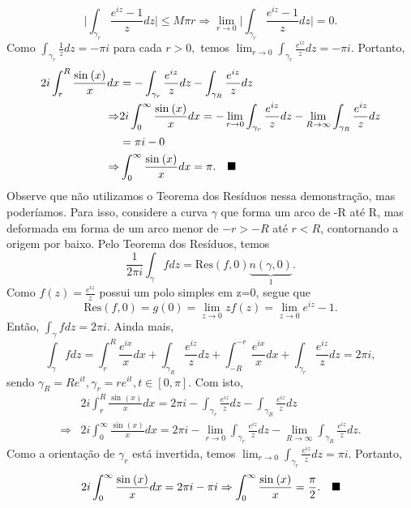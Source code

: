 \documentclass[ComplexAnalysis/complex.tex]{subfiles}
\begin{document}
\begin{exer*}
	\[
		\biggl\vert \int_{\gamma_{r}}^{}\frac{e^{iz}-1}{z}dz \biggr\vert \leq M\pi r \Rightarrow \lim_{r\to 0}\biggl\vert \int_{\gamma_{r}}^{}\frac{e^{iz}-1}{z}dz \biggr\vert = 0.
	\]
	Como \(\int_{\gamma_{r}}^{}\frac{1}{z}dz = -\pi i  \) para cada \(r > 0,\) temos \(\lim_{r\to 0}\int_{\gamma_{r}}^{}\frac{e^{iz}}{z}dz = -\pi i.\)
	Portanto,
	\begin{align*}
		2i \int_{r}^{R}\frac{\sin^{}{(x)}}{x}dx & = -\int_{\gamma_{r}}^{}\frac{e^{iz}}{z}dz - \int_{\gamma_{R}}^{}\frac{e^{iz}}{z}dz                                                                          \\
		\Rightarrow                             & 2i \int_{0}^{\infty}\frac{\sin^{}{(x)}}{x}dx= -\lim_{r\to 0}\int_{\gamma_{r}}^{}\frac{e^{iz}}{z}dz - \lim_{R\to \infty}\int_{\gamma_R}^{}\frac{e^{iz}}{z}dz \\
		                                        & =\pi i - 0                                                                                                                                                  \\
		\Rightarrow                             & \int_{0}^{\infty}\frac{\sin^{}{(x)}}{x}dx = \pi .\quad \text{$\blacksquare$}
	\end{align*}
	Observe que não utilizamos o Teorema dos Resíduos nessa demonstração, mas poderíamos. Para isso, considere a curva \(\gamma \)
	que forma um arco de -R até R, mas deformada em forma de um arco menor de \(-r > -R\) até \(r < R\), contornando a origem por baixo. Pelo Teorema
	dos Resíduos, temos
	\[
		\frac{1}{2\pi i}\int_{\gamma }^{}f dz = \mathrm{Res}(f, 0)\underbrace{n(\gamma , 0)}_{1}.
	\]
	Como \(f(z) = \frac{e^{iz}}{z}\) possui um polo simples em z=0, segue que
	\[
		\mathrm{Res}(f, 0) = g(0) = \lim_{z\to 0}zf(z) = \lim_{z\to 0}e^{iz}-1.
	\]
	Então, \(\int_{\gamma }^{}f dz = 2\pi i.\) Ainda mais,
	\[
		\int_{\gamma }^{}f dz = \int_{r}^{R}\frac{e^{ix}}{x}dx + \int_{\gamma _{R}}^{}\frac{e^{iz}}{z}dz + \int_{-R}^{-r}\frac{e^{ix}}{x}dx + \int_{\gamma_{r}}^{}\frac{e^{iz}}{z}dz = 2\pi i,
	\]
	sendo \(\gamma _{R} = R e^{it}, \gamma_{r} = r e^{it}, t\in[0, \pi ].\) Com isto,
	\begin{align*}
		            & 2i \int_{r}^{R}\frac{\sin^{}{(x)}}{x}dx =2\pi i - \int_{\gamma_{r}}^{}\frac{e^{iz}}{z}dz - \int_{\gamma_{R}}^{}\frac{e^{iz}}{z}dz                                       \\
		\Rightarrow & 2i \int_{0}^{\infty}\frac{\sin^{}{(x)}}{x}dx = 2\pi i - \lim_{r\to 0}\int_{\gamma_{r}}^{}\frac{e^{iz}}{z}dz - \lim_{R\to \infty}\int_{\gamma_{R}}^{}\frac{e^{iz}}{z}dz.
	\end{align*}
	Como a orientação de \(\gamma_r \) está invertida, temos \(\lim_{r\to 0}\int_{\gamma_{r}}^{}\frac{e^{iz}}{z}dz = \pi i.\) Portanto,
	\[
		2i \int_{0}^{\infty}\frac{\sin^{}{(x)}}{x}dx = 2\pi i - \pi i \Rightarrow \int_{0}^{\infty}\frac{\sin^{}{(x)}}{x} = \frac{\pi }{2}.\quad \text{$\blacksquare$}
	\]
\end{exer*}
\end{document}
